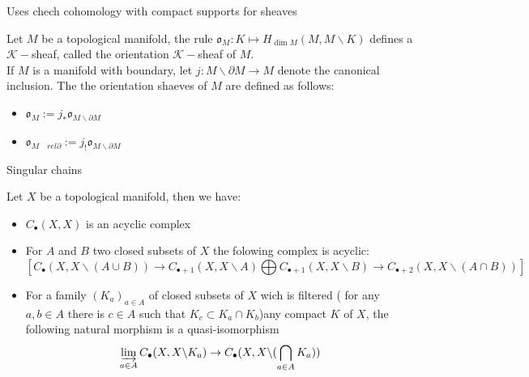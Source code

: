 Uses chech cohomology with compact supports for sheaves 

\begin{definition}\label{def:orientation_sheaf_of_a_manifold}
    Let $M$ be a topological manifold, the rule $\mathfrak{o}_M:K\mapsto H_{\dim M}(M,M\backslash K)$ defines a $\mathcal{K}-$sheaf, called the orientation $\mathcal{K}-$sheaf of $M$.\\

    If $M$ is a manifold with boundary, let $j:M\backslash \partial M\to M$ denote the canonical inclusion. The the orientation shaeves of $M$ are defined as follows:\begin{itemize}
        \item $\mathfrak{o}_M:= j_*\mathfrak{o}_{M\backslash \partial M}$
        \item $\mathfrak{o}_{M\quad rel \partial}:= j_!\mathfrak{o}_{M\backslash \partial M}$
    \end{itemize}

\end{definition}

\begin{definition}\label{def:singular_chain}
    Singular chains
\end{definition}

\begin{lemma}\label{lem:Homotopy_k-sheaf_axioms_for_singular_chain}
    Let $X$ be a topological manifold, then we have: \begin{itemize}
    \item $C_{\bullet}(X,X)$ is an acyclic complex
    \item For $A$ and $B$ two closed subsets of $X$ the folowing complex is acyclic: \[ [C_{\bullet}(X,X\backslash (A\cup B))\to C_{\bullet+1}(X,X\backslash A)\bigoplus C_{\bullet+1}(X,X\backslash B)\to C_{\bullet+2}(X,X\backslash (A\cap B)) ]\]
    \item For a family $(K_a)_{a\in A}$ of closed subsets of $X$ wich is filtered ( for any $a,b\in A$ there is $c\in A$ such that $K_c\subset K_a\cap K_b$)any compact $K$ of $X$, the following natural morphism is a quasi-isomorphism \[\varinjlim\limits_{a\in A} C_{\bullet}(X,X\backslash K_a)\to C_{\bullet}(X,X\backslash (\bigcap\limits_{a\in A}K_a))\]
    \end{itemize}

\end{lemma}

